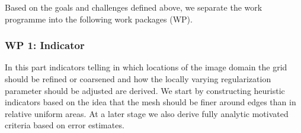 \documentclass[enabledeprecatedfontcommands,cleardoublepage=empty,headsepline,twoside,11pt,DIV=15,BCOR=12mm,final]{scrartcl}
\begin{document}
 
 Based on the goals and challenges defined above, we separate the work programme into the following work packages (WP).
 
 
\subsubsection*{WP 1: Indicator}
In this part indicators telling in which locations of the image domain the grid should be refined or coarsened and how the locally varying regularization parameter should be adjusted are derived. We start by constructing heuristic indicators based on the idea that the mesh should be finer around edges than in relative uniform areas. At a later stage we also derive fully analytic motivated criteria based on error estimates.
 
\end{document}
